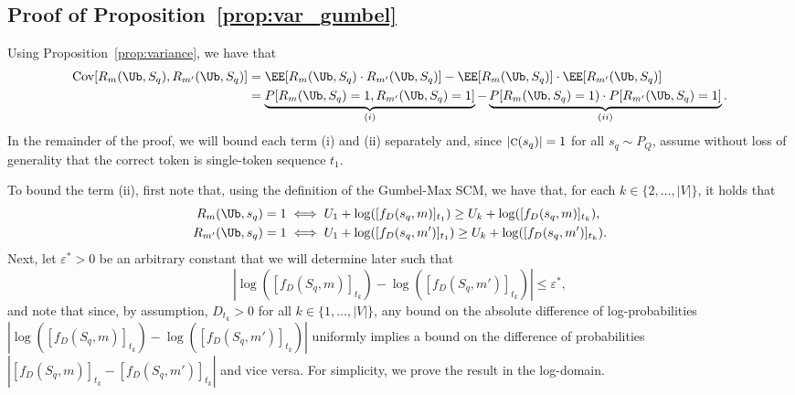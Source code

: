\subsection{Proof of Proposition~\ref{prop:var_gumbel}}
%
Using Proposition~\ref{prop:variance}, we have that
%
    \begin{align*}
            \Cov[R_m(\Ub,S_q),R_{m'}(\Ub,S_q)] &= \EE[R_m(\Ub,S_q)\cdot R_{m'}(\Ub,S_q)]-\EE[R_m(\Ub,S_q)]\cdot  \EE[R_{m'}(\Ub,S_q)]\\
            &= \underbrace{\PP[R_m(\Ub,S_q)=1, R_{m'}(\Ub,S_q)=1
            ]}_{(i)}-\underbrace{\PP[R_m(\Ub,S_q)=1) \cdot \PP[R_{m'}(\Ub,S_q)=1]}_{(ii)}.
    \end{align*}
%
In the remainder of the proof, we will bound each term (i) and (ii) separately and, since $|\textsc{c}(s_q)|=1$ for all $s_q \sim P_{Q}$, assume without loss of generality that the correct token is single-token sequence $t_1$.

To bound the term (ii), first note that, using the definition of the Gumbel-Max SCM, we have that, for each $k \in \{2, \ldots, |V|\}$, it holds that
%
\begin{align*}
            R_{m}(\Ub,s_q)=1 &\iff U_1 + \log ( [f_D(s_q,m)]_{t_1} ) \geq U_k + \log ( [f_D(s_q, m)]_{t_k} ), \\
            R_{m'}(\Ub,s_q)=1 &\iff U_1 + \log ( [f_D(s_q,m')]_{t_1} ) \geq U_k + \log ( [f_D(s_q, m')]_{t_k} ).
\end{align*}
%
Next, let $\varepsilon^*>0$ be an arbitrary constant that we will determine later such that
%
\begin{equation} \label{eq:bound}
    |\log ( [f_D(S_q,m)]_{t_k}) -\log ([f_D(S_q,m')]_{t_k}) |\leq \varepsilon^*,
\end{equation}
%
and note that since, by assumption, $D_{t_k} > 0$ for all $k \in \{1, \ldots, |V|\}$, any bound on the absolute difference of log-probabilities $|\log ( [f_D(S_q,m)]_{t_k}) -\log ([f_D(S_q,m')]_{t_k}) |$ uniformly implies a bound on the difference of probabilities $|[f_D(S_q,m)]_{t_k} -[f_D(S_q,m')]_{t_k} |$ and vice versa. 
%
For simplicity, we prove the result in the log-domain.

